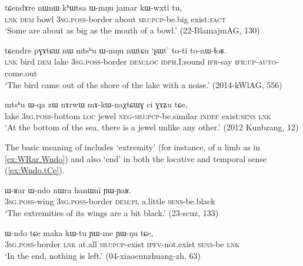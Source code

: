 \begin{exe}
\ex \label{ex:khWtsa.WmNu}
\gll  tɕendɤre nɯnɯ kʰɯtsa ɯ-mŋu jamar kɯ-wxti tu,\\
\textsc{lnk} \textsc{dem} bowl \textsc{3sg}.\textsc{poss}-border about \textsc{sbj}:\textsc{pcp}-be.big exist:\textsc{fact}\\
\glt  `Some are about as big as the mouth of a bowl.' (22-BlamajmAG, 130)
\end{exe}

\begin{exe}
\ex \label{ex:mtshu.WmNu}
\gll   tɕendre pɣɤtɕɯ nɯ mtsʰu ɯ-mŋu nɯtɕu `ʂɯt' to-ti to-nɯ-ɬoʁ.  \\
\textsc{lnk} bird \textsc{dem} lake \textsc{3sg}.\textsc{poss}-border \textsc{dem}:\textsc{loc} \textsc{idph}.I:sound \textsc{ifr}-say \textsc{ifr}:\textsc{up}-\textsc{auto}-come.out \\
\glt  `The bird came out of the shore of the lake with a noise.' (2014-kWlAG, 556)
\end{exe}

\begin{exe}
\ex \label{ex:mtshu.Wqa}
\gll  mtsʰu ɯ-qa zɯ nɤrwɯ mɤ-kɯ-naχtɕɯɣ ci ɣɤʑu tɕe, \\
lake \textsc{3sg}.\textsc{poss}-bottom \textsc{loc} jewel \textsc{neg}-\textsc{sbj}:\textsc{pcp}-be.similar \textsc{indef} exist:\textsc{sens} \textsc{lnk} \\
\glt `At the bottom of the sea, there is a jewel unlike any other.' (2012 Kunbzang, 12)
\end{exe}

The basic meaning of  includes `extremity' (for instance, of a limb as in \ref{ex:WRar.Wndo}) and also `end' in both the locative and temporal sense (\ref{ex:Wndo.tCe}).

\begin{exe}
\ex \label{ex:WRar.Wndo}
\gll ɯ-ʁar ɯ-ndo nɯra hanɯni ɲɯ-ɲaʁ. \\ 
\textsc{3sg}.\textsc{poss}-wing \textsc{3sg}.\textsc{poss}-border \textsc{dem}:\textsc{pl} a.little \textsc{sens}-be.black \\
\glt  `The extremities of its wings are a bit black.' (23-scuz, 133)
\end{exe}

\begin{exe}
\ex \label{ex:Wndo.tCe}
\gll  ɯ-ndo tɕe maka kɯ-tu ɲɯ-me ɲɯ-ŋu tɕe,  \\
\textsc{3sg}.\textsc{poss}-border \textsc{lnk} at.all \textsc{sbj}:\textsc{pcp}-exist \textsc{ipfv}-not.exist \textsc{sens}-be \textsc{lnk} \\
\glt `In the end, nothing is left.' (04-xiaocunzhuang-zh, 63)
\end{exe}

